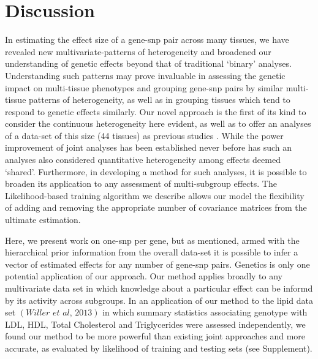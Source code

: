 \section{Discussion}

In estimating the effect size of a gene-snp pair across many tissues, we have revealed new multivariate-patterns of heterogeneity and broadened our understanding of genetic effects beyond that of traditional `binary' analyses. Understanding such patterns may prove invaluable in assessing the genetic impact on multi-tissue phenotypes and grouping gene-snp pairs by similar multi-tissue patterns of heterogeneity, as well as in grouping tissues which tend to respond to genetic effects similarly. Our novel approach is the first of its kind to consider the continuous heterogeneity here evident, as well as to offer an analyses of a data-set of this size (44 tissues) as previous studies \cite{consortium_genotype-tissue_2015}. While the power improvement of joint analyses has been established \cite{flutre_statistical_2013} never before has such an analyses also considered quantitative heterogeneity among effects deemed `shared'. Furthermore, in developing a method for such analyses, it is possible to broaden its application to any assessment of multi-subgroup effects. The Likelihood-based training algorithm we describe allows our model the flexibility of adding and removing the appropriate  number of covariance matrices from the ultimate estimation.

Here, we present work on one-snp per gene, but as mentioned, armed with the hierarchical prior information from the overall data-set it is possible to infer a vector of estimated effects for any number of gene-snp pairs. Genetics is only one potential application of our approach. Our method applies broadly to any multivariate data set in which knowledge about a particular effect can be informd by its activity across subgroups. In an application of our method to the lipid data set $(\textit{Willer et al, 2013})$ in which summary statistics associating genotype with LDL, HDL, Total Cholesterol and Triglycerides were assessed independently, we found our method to be more powerful than existing joint approaches and more accurate, as evaluated by likelihood of training and testing sets (see Supplement).